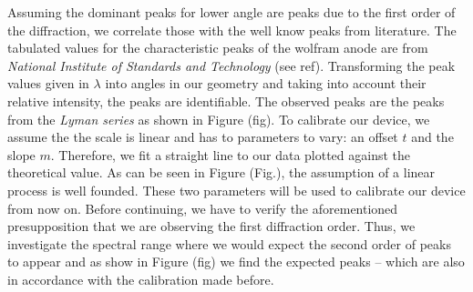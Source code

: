 Assuming the dominant peaks for lower angle are peaks due to the first order of the diffraction, we correlate those with the well know peaks from literature. The tabulated values for the characteristic peaks of the wolfram anode are from \textit{National Institute of Standards and Technology} (see ref).
Transforming the peak values given in $\lambda$ into angles in our geometry and taking into account their relative intensity, the peaks are identifiable.
The observed peaks are the peaks from the \textit{Lyman series} as shown in Figure (fig). To calibrate our device, we assume the the scale is linear and has to parameters to vary: an offset $t$ and the slope $m$. Therefore, we 
fit a straight line to our data plotted against the theoretical value. As can be seen in Figure (Fig.), the assumption of a linear process is well founded. 
These two parameters will be used to calibrate our device from now on. Before continuing, we have to verify the aforementioned presupposition that we are observing the first diffraction order.
Thus, we investigate the spectral range where we would expect the second order of peaks to appear and as show in Figure (fig) we find the expected peaks -- which are also in accordance with the calibration made before.


